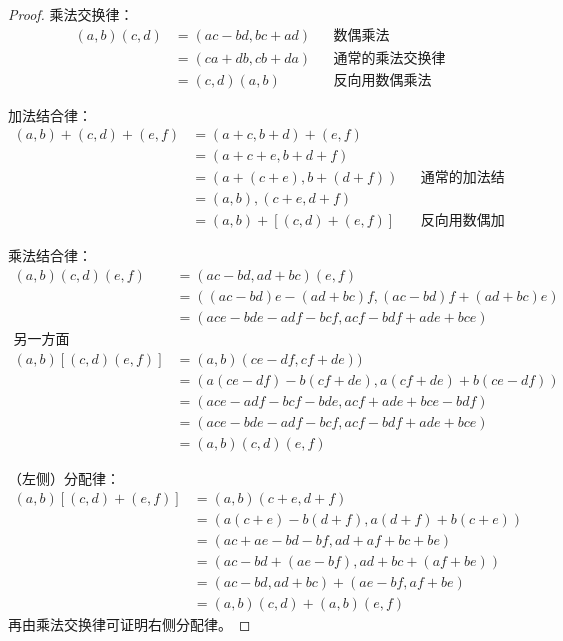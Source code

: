 \documentclass[b5paper]{ctexart}
\begin{document}
\begin{Answer}[ref={ex:complex}]
{\begin{proof}
乘法交换律：
\begin{align*}
(a, b)(c, d) &= (ac - bd, bc + ad) && \text{数偶乘法} \\
  &= (ca + db, cb + da) && \text{通常的乘法交换律} \\
  &= (c, d)(a, b) && \text{反向用数偶乘法}
\end{align*}

加法结合律：
\begin{align*}
(a, b) + (c, d) + (e, f) &= (a + c, b + d) + (e, f) \\
  &= (a + c + e, b + d + f) \\
  &= (a + (c + e), b + (d + f)) && \text{通常的加法结合律} \\
  &= (a, b), (c + e, d + f) \\
  &= (a, b) + [(c, d) + (e, f)] && \text{反向用数偶加法}
\end{align*}

乘法结合律：
\begin{align*}
(a, b)(c, d)(e, f) &= (ac - bd, ad + bc)(e, f) \\
  &= ((ac - bd)e - (ad + bc)f, (ac - bd)f + (ad + bc)e) \\
  &= (ace - bde - adf - bcf, acf - bdf + ade + bce) \\
\text{另一方面} \\
(a, b)[(c, d)(e, f)] &= (a, b)(ce - df, cf + de)) \\
  &= (a(ce - df) - b(cf + de), a(cf + de) + b(ce - df)) \\
  &= (ace - adf - bcf - bde, acf + ade + bce - bdf) \\
  &= (ace - bde - adf - bcf, acf - bdf + ade + bce) \\
  &= (a, b)(c, d)(e, f)
\end{align*}

（左侧）分配律：
\begin{align*}
(a, b)[(c, d) + (e, f)] &= (a, b)(c + e, d + f) \\
  &= (a(c + e) - b(d + f), a(d + f) + b(c + e)) \\
  &= (ac + ae - bd - bf, ad + af + bc + be) \\
  &= (ac - bd + (ae - bf), ad + bc + (af + be)) \\
  &= (ac - bd, ad + bc) + (ae - bf, af + be) \\
  &= (a, b)(c, d) + (a, b)(e, f)
\end{align*}
再由乘法交换律可证明右侧分配律。
\end{proof}
}

\end{Answer}
\end{document}

